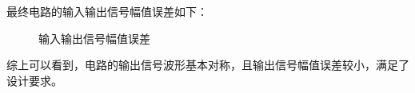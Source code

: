 \documentclass[UTF8,titlepage,a4paper]{ctexart}
\numberwithin{figure}{section}
\begin{document}
最终电路的输入输出信号幅值误差如下：
\begin{figure}[H]
\centering
 \caption{输入输出信号幅值误差}
 \label{}
\end{figure}

综上可以看到，电路的输出信号波形基本对称，且输出信号幅值误差较小，满足了设计要求。
\end{document}

